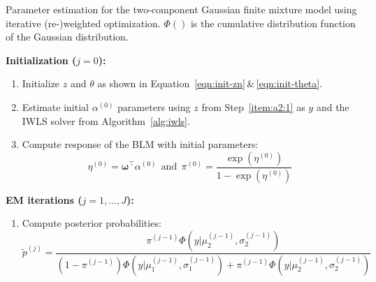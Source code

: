 \documentclass[article,nojss,shortnames]{jss}
\begin{document}
\begin{algorithm}
    \caption{Parameter estimation for the two-component Gaussian finite mixture model
    using iterative (re-)weighted optimization. $\Phi()$ is the cumulative distribution
    function of the Gaussian distribution.}
    
    \textbf{Initialization ($j = 0$):}
    \begin{enumerate}
        \item Initialize $\mathit{z}$ and $\mathit{\theta}$ as shown in
            Equation~\ref{eqn:init-zn}\,\&\,\ref{eqn:init-theta}.\label{item:a2:1}

        \item Estimate initial $\alpha^{(0)}$ parameters using $\mathit{z}$ from
            Step~\ref{item:a2:1} as $\mathit{y}$ and the IWLS solver from
            Algorithm~\ref{alg:iwls}.

        \item Compute response of the BLM with initial parameters:
            \begin{equation*}
                \mathit{\eta}^{(0)} = \mathbf{\omega}^\top \mathit{\alpha}^{(0)}
                ~~\text{and}~~
                \mathit{\pi}^{(0)} = \frac{\exp(\mathit{\eta}^{(0)})}{1 - \exp(\mathit{\eta}^{(0)})}
            \end{equation*}
    \end{enumerate}

    \textbf{EM iterations ($j = 1, \dots, J$):}
    \begin{enumerate}



        \item Compute posterior probabilities:
            \begin{equation*}
                \tilde{\mathit{p}}^{(j)} = 
                \frac{
                    \mathit{\pi}^{(j-1)} \Phi(\mathit{y} | \mu_2^{(j-1)}, \sigma_2^{(j-1)})
                }{
                    (1 - \mathit{\pi}^{(j-1)}) \Phi(\mathit{y} | \mu_1^{(j-1)}, \sigma_1^{(j-1)}) +
                    \mathit{\pi}^{(j-1)} \Phi(\mathit{y} | \mu_2^{(j-1)}, \sigma_2^{(j-1)})
                }
            \end{equation*}


\end{enumerate}
\end{algorithm}
\end{document}
